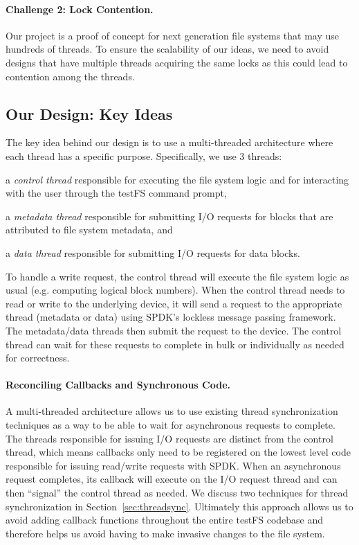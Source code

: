 \paragraph{Challenge 2: Lock Contention.}
Our project is a proof of concept for next generation file systems that may use
hundreds of threads. To ensure the scalability of our ideas, we need to avoid
designs that have multiple threads acquiring the same locks as this could
lead to contention among the threads.

\subsection{Our Design: Key Ideas}
The key idea behind our design is to use a multi-threaded architecture where
each thread has a specific purpose. Specifically, we use 3 threads:
\begin{enumerate*}[label={(\roman*)}]
  \item a {\it control thread} responsible for executing the file system logic
    and for interacting with the user through the testFS command prompt,
  \item a {\it metadata thread} responsible for submitting I/O requests for
    blocks that are attributed to file system metadata, and
  \item a {\it data thread} responsible for submitting I/O requests for data
    blocks.
\end{enumerate*}

To handle a write request, the control thread will execute the file system
logic as usual (e.g. computing logical block numbers). When the control thread
needs to read or write to the underlying device, it will send a request to the
appropriate thread (metadata or data) using SPDK's lockless message passing
framework. The metadata/data threads then submit the request to the device. The
control thread can wait for these requests to complete in bulk or individually
as needed for correctness.

\paragraph{Reconciling Callbacks and Synchronous Code.}
A multi-threaded architecture allows us to use existing thread synchronization
techniques as a way to be able to wait for asynchronous requests to complete.
The threads responsible for issuing I/O requests are distinct from the control
thread, which means callbacks only need to be registered on the lowest level
code responsible for issuing read/write requests with SPDK. When an
asynchronous request completes, its callback will execute on the I/O request
thread and can then ``signal'' the control thread as needed. We discuss two
techniques for thread synchronization in Section~\ref{sec:threadsync}.
Ultimately this approach allows us to avoid adding callback functions
throughout the entire testFS codebase and therefore helps us avoid having to
make invasive changes to the file system.

